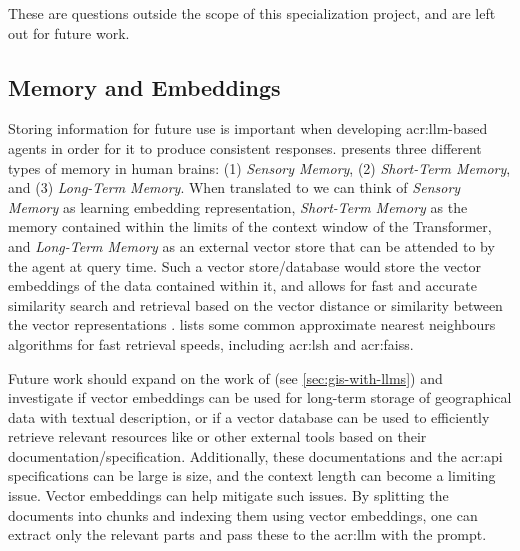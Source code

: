 These are questions outside the scope of this specialization project, and are left out for future work.

\subsection{Memory and Embeddings}

Storing information for future use is important when developing \acrshort{acr:llm}-based agents in order for it to produce consistent responses. \cite{wengLLMPoweredAutonomous2023} presents three different types of memory in human brains: (1) \textit{Sensory Memory}, (2) \textit{Short-Term Memory}, and (3) \textit{Long-Term Memory}. When translated to  we can think of \textit{Sensory Memory} as learning embedding representation, \textit{Short-Term Memory} as the memory contained within the limits of the context window of the Transformer, and  \textit{Long-Term Memory} as an external vector store that can be attended to by the agent at query time. Such a vector store/database would store the vector embeddings of the data contained within it, and allows for fast and accurate similarity search and retrieval based on the vector distance or similarity between the vector representations \citep{evchakiVectorDatabase2023}. \cite{wengLLMPoweredAutonomous2023} lists some common approximate nearest neighbours algorithms for fast retrieval speeds, including \gls{acr:lsh} and \gls{acr:faiss}.

Future work should expand on the work of \cite{unluChatmapLargeLanguage2023} (see \autoref{sec:gis-with-llms}) and investigate if vector embeddings can be used for long-term storage of geographical data with textual description, or if a vector database can be used to efficiently retrieve relevant resources like  or other external tools based on their documentation/specification. Additionally, these documentations and the \acrshort{acr:api} specifications can be large is size, and the context length can become a limiting issue. Vector embeddings can help mitigate such issues. By splitting the documents into chunks and indexing them using vector embeddings, one can extract only the relevant parts and pass these to the \acrshort{acr:llm} with the prompt.

\glsaddall